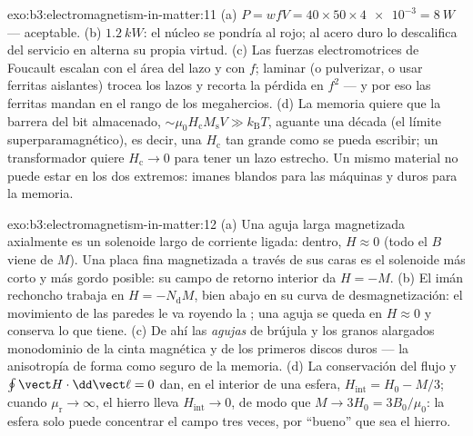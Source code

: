 \begin{solution}{exo:b3:electromagnetism-in-matter:11}
(a) $P = wfV = 40\times50\times\num{4e-3} = \qty{8}{W}$ ---
aceptable. (b) $\qty{1.2}{kW}$: el núcleo se pondría al rojo; al acero duro
lo descalifica del servicio en alterna su propia virtud. (c) Las fuerzas
electromotrices de Foucault escalan con el área del lazo y con $f$; laminar (o pulverizar, o usar
ferritas aislantes) trocea los lazos y recorta la pérdida en $f^2$ ---
y por eso las ferritas mandan en el rango de los megahercios. (d) La memoria quiere
que la barrera del bit almacenado, $\sim\mu_0H_{\text{c}}M_{\text{s}}V \gg
k_{\text{B}}T$, aguante una década (el límite superparamagnético), es decir,
una $H_{\text{c}}$ tan grande como se pueda escribir; un transformador quiere
$H_{\text{c}} \to 0$ para tener un lazo estrecho. Un mismo material no puede estar en
los dos extremos: imanes blandos para las máquinas y duros para la memoria.
\end{solution}

\begin{solution}{exo:b3:electromagnetism-in-matter:12}
(a) Una aguja larga magnetizada axialmente es un solenoide largo de corriente
ligada: dentro, $H \approx 0$ (todo el $B$ viene de $M$). Una placa fina
magnetizada a través de sus caras es el solenoide más corto y más gordo
posible: su campo de retorno interior da $H = -M$. (b)
El imán rechoncho trabaja en $H = -N_{\text{d}}M$, bien abajo en su
curva de desmagnetización: el movimiento de las paredes le va royendo la ; una
aguja se queda en $H \approx 0$ y conserva lo que tiene. (c) De ahí las
\emph{agujas} de brújula y los granos alargados monodominio de la
cinta magnética y de los primeros discos duros --- la anisotropía de forma como
seguro de la memoria. (d) La conservación del flujo y $\oint\vect H\cdot
\dd\vect\ell = 0$ dan, en el interior de una esfera, $H_{\text{int}} =
H_0 - M/3$; cuando $\mu_{\text{r}}\to\infty$, el hierro lleva
$H_{\text{int}}\to0$, de modo que $M \to 3H_0 = 3B_0/\mu_0$: la esfera solo puede
concentrar el campo tres veces, por ``bueno'' que sea el hierro.
\end{solution}

